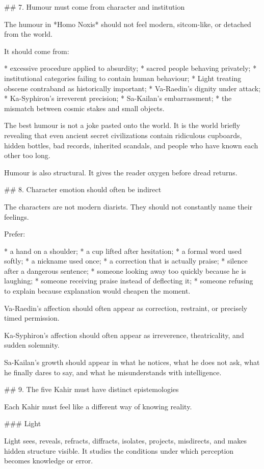 ## 7. Humour must come from character and institution

The humour in *Homo Noxis* should not feel modern, sitcom-like, or detached from the world.

It should come from:

* excessive procedure applied to absurdity;
* sacred people behaving privately;
* institutional categories failing to contain human behaviour;
* Light treating obscene contraband as historically important;
* Va-Raedin’s dignity under attack;
* Ka-Syphiron’s irreverent precision;
* Sa-Kailan’s embarrassment;
* the mismatch between cosmic stakes and small objects.

The best humour is not a joke pasted onto the world. It is the world briefly revealing that even ancient secret civilizations contain ridiculous cupboards, hidden bottles, bad records, inherited scandals, and people who have known each other too long.

Humour is also structural. It gives the reader oxygen before dread returns.

## 8. Character emotion should often be indirect

The characters are not modern diarists. They should not constantly name their feelings.

Prefer:

* a hand on a shoulder;
* a cup lifted after hesitation;
* a formal word used softly;
* a nickname used once;
* a correction that is actually praise;
* silence after a dangerous sentence;
* someone looking away too quickly because he is laughing;
* someone receiving praise instead of deflecting it;
* someone refusing to explain because explanation would cheapen the moment.

Va-Raedin’s affection should often appear as correction, restraint, or precisely timed permission.

Ka-Syphiron’s affection should often appear as irreverence, theatricality, and sudden solemnity.

Sa-Kailan’s growth should appear in what he notices, what he does not ask, what he finally dares to say, and what he misunderstands with intelligence.

## 9. The five Kahir must have distinct epistemologies

Each Kahir must feel like a different way of knowing reality.

### Light

Light sees, reveals, refracts, diffracts, isolates, projects, misdirects, and makes hidden structure visible. It studies the conditions under which perception becomes knowledge or error.

